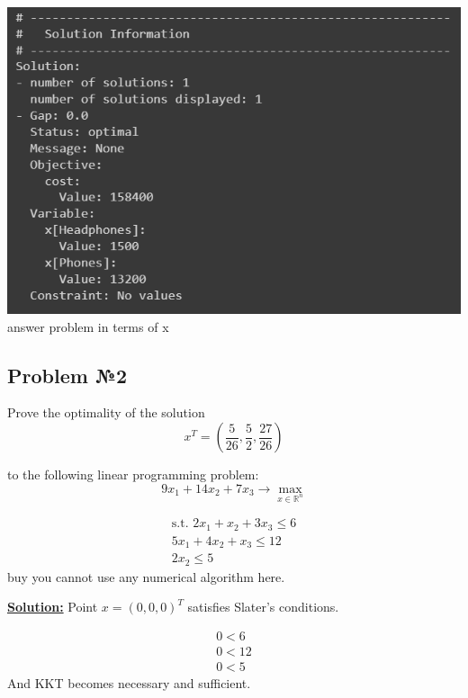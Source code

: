 \begin{center}
    \includegraphics[scale=0.58]{pictures/task_11_xans.png} \\
    answer problem in terms of x
\end{center}


\subsection{Problem №2}
Prove the optimality of the solution
\begin{equation*}
    x^T = \left( \frac{5}{26}, \frac{5}{2}, \frac{27}{26} \right)
\end{equation*}

to the following linear programming problem:
\begin{equation*}
    9x_1 + 14x_2 + 7x_3 \rightarrow \max_{x \in \mathds{R}^n}
\end{equation*}

\begin{equation*}
\begin{gathered}
    \text{s.t. } 2x_1 + x_2 + 3x_3 \leq 6 \\
    5x_1 + 4x_2 + x_3 \leq 12 \\
    2x_2 \leq 5
\end{gathered}
\end{equation*}
buy you cannot use any numerical algorithm here.

\underline{\textbf{Solution:}}
Point $x = \left( 0, 0, 0 \right)^T$ satisfies Slater's conditions.

\begin{equation*}
\begin{gathered}
        0 < 6  \\
        0 < 12 \\
        0 < 5
\end{gathered}
\end{equation*}
And KKT becomes necessary and sufficient.

